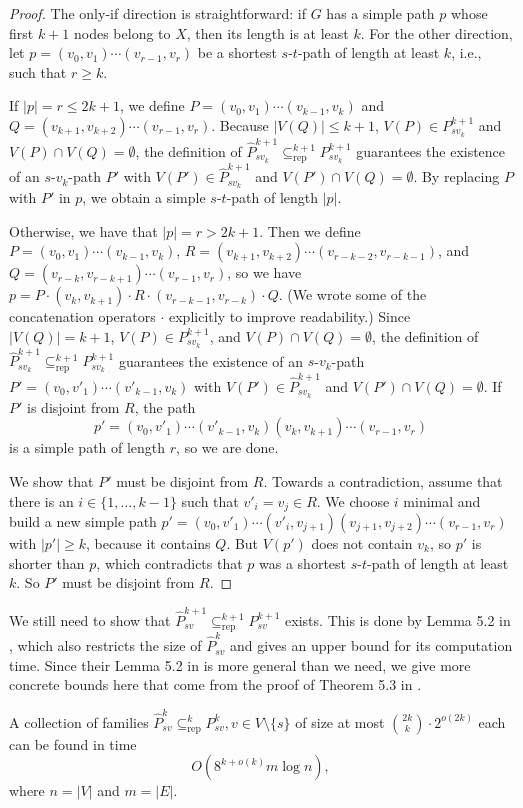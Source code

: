 \documentclass[a4paper,english]{lipics-v2016}
\theoremstyle{plain}
\begin{document}
\begin{proof}
  The only-if direction is straightforward: if $G$ has a simple path
  $p$ whose first $k+1$ nodes belong to $X$, then its length is at
  least $k$.  For the other direction, let $p=(v_0,v_1) \cdots
  (v_{r-1},v_r)$ be a shortest $s$-$t$-path of length at least $k$,
  i.e., such that $r \geq k$.
 
  If $|p|=r \leq 2k+1$,   we define $P= (v_0,v_1) \cdots (v_{k-1},v_k)$ and $Q=
  (v_{k+1},v_{k+2}) \cdots \allowbreak (v_{r-1},v_r)$. Because $|V(Q)|
  \leq k+1$, $V(P) \in P^{k+1}_{sv_k}$ and $V(P)\cap V(Q)= \emptyset$,
  the definition of $\hat{P}^{k+1}_{sv_k} \subseteq^{k+1}_\text{rep}
  P^{k+1}_{sv_k}$ guarantees the existence of an $s$-$v_k$-path $P'$
  with $V(P') \in \hat{P}^{k+1}_{sv_k}$ and $V(P') \cap V(Q) =
  \emptyset$. By replacing $P$ with $P'$ in $p$, we obtain a simple
  $s$-$t$-path of length $|p|$.


  Otherwise, we have that $|p| = r > 2k+1$.  Then we define $P=
  (v_0,v_1) \cdots (v_{k-1},v_k)$, $R = (v_{k+1},v_{k+2}) \cdots
  \allowbreak (v_{r-k-2},v_{r-k-1})$, and $Q= (v_{r-k},v_{r-k+1})
  \cdots \allowbreak (v_{r-1},v_r)$, so we have $p = P\cdot (v_k,v_{k+1})\cdot R\cdot (v_{r-k-1},v_{r-k})\cdot Q.$  (We wrote some of the
  concatenation operators $\cdot$ explicitly to improve readability.)
    Since $|V(Q)| = k+1$, $V(P) \in
  P^{k+1}_{sv_k}$, and $V(P)\cap V(Q)= \emptyset$, the definition of
  $\hat{P}^{k+1}_{sv_k} \subseteq^{k+1}_\text{rep} P^{k+1}_{sv_k}$
  guarantees the existence of an $s$-$v_k$-path $P'= (v_0,v'_1) \cdots
  (v'_{k-1},v_k)$ with $V(P') \in \hat{P}^{k+1}_{sv_k}$ and $V(P')
  \cap V(Q) = \emptyset$.  If $P'$ is disjoint from $R$, the path
  $$p' = (v_0,v'_1) \cdots (v'_{k-1},v_k)(v_k,v_{k+1}) \cdots
  (v_{r-1},v_r)$$ is a simple path of length $r$, so we are done.
      
  We show that $P'$ must be disjoint from $R$. Towards a
  contradiction, assume that there is an $i \in \{1, \ldots, k-1\}$
  such that $v'_i=v_j \in R$. We choose $i$ minimal and build a new
  simple path $p' = (v_0,v'_1) \cdots
  (v'_{i},v_{j+1})(v_{j+1},v_{j+2}) \cdots (v_{r-1},v_r)$ with $|p'|
  \geq k$, because it contains $Q$. But $V(p')$ does not contain
  $v_{k}$, so $p'$ is shorter than $p$, which contradicts that $p$ was
  a shortest $s$-$t$-path of length at least $k$.  So
  $P'$ must be disjoint from
  $R$. \end{proof}

We still need to show that $\hat{P}^{k+1}_{sv} \subseteq^{k+1}_\text{rep}
P^{k+1}_{sv}$ exists.  This is done by Lemma 5.2 in \cite{fomin},
which also restricts the size of $\hat{P}^k_{sv}$ and gives an upper
bound for its computation time. Since their Lemma 5.2 in \cite{fomin}
is 
more general than we need, we give more concrete bounds here that come
from the proof of Theorem 5.3 in \cite{fomin}.
\begin{lemma}
\label{lemmaSizeBound}
A collection of families $\hat{P}^k_{sv} \subseteq^k_\text{rep} P^k_{sv}, v \in V\setminus \{s\}$ of size at most $\binom{2k}{k} \cdot 2^{o(2k)}$ each can be found in time 
$$O\left( 8^{k+o(k)}m \log n \right),$$ 
where $n = |V|$ and $m = |E|$.
\end{lemma}
\end{document}
